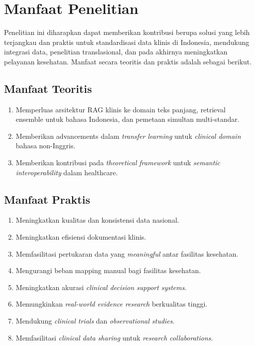 \section{Manfaat Penelitian}

Penelitian ini diharapkan dapat memberikan kontribusi berupa solusi yang lebih terjangkau dan praktis untuk standardisasi data klinis di Indonesia, mendukung integrasi data, penelitian translasional, dan pada akhirnya meningkatkan pelayanan kesehatan. Manfaat secara teoritis dan praktis adalah sebagai berikut.

\subsection{Manfaat Teoritis}
\begin{enumerate}
    \item Memperluas arsitektur RAG klinis ke domain teks panjang, retrieval ensemble untuk bahasa Indonesia, dan pemetaan simultan multi-standar.
    \item Memberikan advancements dalam \textit{transfer learning} untuk \textit{clinical domain} bahasa non-Inggris.
    \item Memberikan kontribusi pada \textit{theoretical framework} untuk \textit{semantic interoperability} dalam healthcare.
\end{enumerate}

\subsection{Manfaat Praktis}
\begin{enumerate}
    \item Meningkatkan kualitas dan konsistensi data nasional.
    \item Meningkatkan efisiensi dokumentasi klinis.
    \item Memfasilitasi pertukaran data yang \textit{meaningful} antar fasilitas kesehatan.
    \item Mengurangi beban mapping manual bagi fasilitas kesehatan.
    \item Meningkatkan akurasi \textit{clinical decision support systems}.
    \item Memungkinkan \textit{real-world evidence research} berkualitas tinggi.
    \item Mendukung \textit{clinical trials} dan \textit{observational studies}.
    \item Memfasilitasi \textit{clinical data sharing} untuk \textit{research collaborations}.
\end{enumerate}